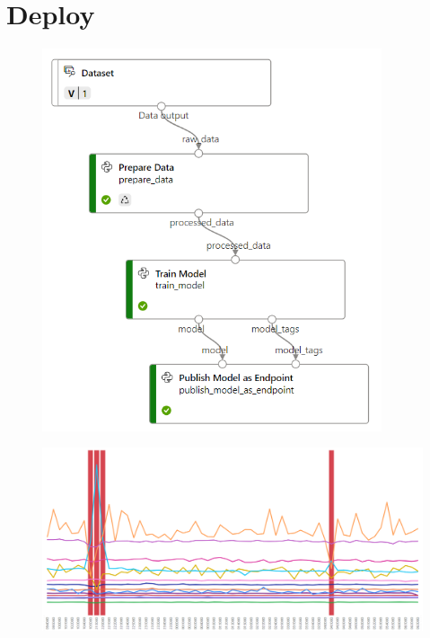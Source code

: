 \chapter{Deploy}

\begin{figure}[t]
\includegraphics[width=10cm, scale=1]{images/pipeline}
\centering
\end{figure}

\begin{figure}[t]
\includegraphics[width=14cm, scale=1]{images/powerbi}
\centering
\end{figure}
